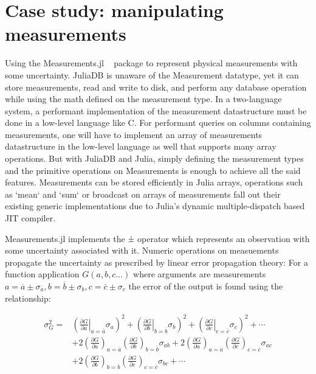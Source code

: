 \documentclass{juliacon}
\begin{document}
\section{Case study: manipulating measurements}
\label{sec:measurements}

Using the Measurements.jl ~\cite{giordano2016} package to represent physical measurements with some uncertainty. JuliaDB is unaware of the Measurement datatype, yet it can store measurements, read and write to disk, and perform any database operation while using the math defined on the measurement type. In a two-language system, a performant implementation of the measurement datastructure must be done in a low-level language like C. For performant queries on columns containing measurements, one will have to implement an array of measurements datastructure in the low-level language as well that supports many array operations. But with JuliaDB and Julia, simply defining the measurement types and the primitive operations on Measurements is enough to achieve all the said features. Measurements can be stored efficiently in Julia arrays, operations such as `mean` and `sum` or broadcast on arrays of measurements fall out their existing generic implementations due to Julia's dynamic multiple-dispatch based JIT compiler.

Measurements.jl implements the ± operator
which represents an observation with some uncertainty associated
with it. Numeric operations on measuements propagate the
uncertainty as prescribed by linear error propagation theory:
For a function application $G(a,b,c...)$ where arguments are measurements $a=\overline{a} \pm \sigma_{a}, b=\overline{b} \pm \sigma_{b}, c=\overline{c} \pm \sigma_{c}$ the error of the output is found using the relationship:

$$
\begin{aligned}\sigma_{G}^{2}=&\left(\left.\frac{\partial G}{\partial a}\right|_{a=\overline{a}} \sigma_{a}\right)^{2}+\left(\left.\frac{\partial G}{\partial b}\right|_{b=\overline{b}} \sigma_{b}\right)^{2}+\left(\left.\frac{\partial G}{\partial c}\right|_{c=\overline{c}} \sigma_{c}\right)^{2}+\cdots \\
&+2\left(\frac{\partial G}{\partial a}\right)_{a=\overline{a}}\left(\frac{\partial G}{\partial b}\right)_{b=\overline{b}} \sigma_{a b}+2\left(\frac{\partial G}{\partial a}\right)_{a=\overline{a}}\left(\frac{\partial G}{\partial c}\right)_{c=\overline{c}} \sigma_{a c} \\ &+2\left(\frac{\partial G}{\partial b}\right)_{b=\overline{b}}\left(\frac{\partial G}{\partial c}\right)_{c=\overline{c}} \sigma_{b c}+\cdots \end{aligned}
$$\\
\end{document}
